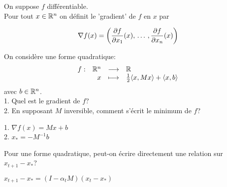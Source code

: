 \begin{note}
  \begin{field}
    On suppose $f$ différentiable.\\
    Pour tout $x \in \mathbb{R}^n$ on définit le 'gradient' de $f$ en $x$ par
  \end{field}
  \begin{field}
    $$\nabla f(x) = \pare{\pd{f}{x_1}(x),\dots, \pd{f}{x_n}(x)}$$
  \end{field}
  \begin{field}

  \end{field}
\end{note}

\begin{note}
  \begin{field}
    On considère une forme quadratique:
    $$\begin{array}[t]{lrcl} f: & \mathbb{R}^n & \longrightarrow & \mathbb{R} \\ & x & \longmapsto & \frac{1}{2}\langle x,Mx\rangle + \langle x,b\rangle \end{array}$$
    avec $b \in \mathbb{R}^n$.\\
    1. Quel est le gradient de $f$?\\
    2. En supposant $M$ inversible, comment s'écrit le minimum de $f$?
  \end{field}
  \begin{field}
    1. $\nabla f(x) = Mx+b$\\
    2. $x_*=-M^{-1}b$
  \end{field}
  \begin{field}

  \end{field}
\end{note}

\begin{note}
  \begin{field}
    Pour une forme quadratique, peut-on écrire directement une
    relation sur $x_{t+1} - x_*$?
  \end{field}
  \begin{field}
    $x_{t+1} - x_* = (I - \alpha_tM)(x_t-x_*)$
  \end{field}
  \begin{field}

  \end{field}
\end{note}


